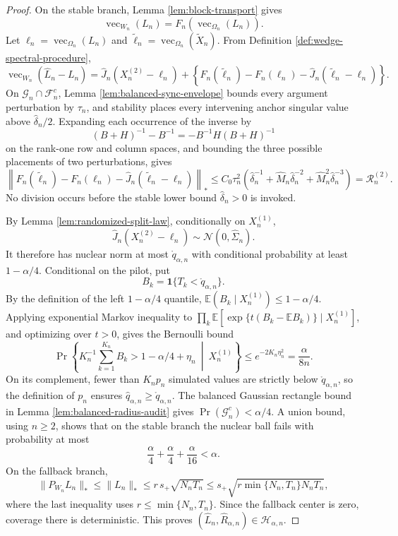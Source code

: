 \documentclass{article}
\begin{document}
\begin{proof}
On the stable branch, Lemma \ref{lem:block-transport} gives
\[
\operatorname{vec}_{W_n}(L_n)
=F_n(\operatorname{vec}_{\Omega_n}(L_n)).
\]
Let \(\ell_n=\operatorname{vec}_{\Omega_n}(L_n)\) and
\(\widetilde\ell_n=\operatorname{vec}_{\Omega_n}(\widetilde X_n)\).  From Definition \ref{def:wedge-spectral-procedure},
\[
\operatorname{vec}_{W_n}(\widehat L_n-L_n)
=\widehat J_n(X_n^{(2)}-\ell_n)
+\left\{F_n(\widetilde\ell_n)-F_n(\ell_n)
-\widehat J_n(\widetilde\ell_n-\ell_n)\right\}.
\]
On \(\mathcal G_n\cap\mathcal F_n^c\), Lemma \ref{lem:balanced-sync-envelope} bounds every argument perturbation by \(\tau_n\), and stability places every intervening anchor singular value above \(\widehat\delta_n/2\).  Expanding each occurrence of the inverse by
\[
(B+H)^{-1}-B^{-1}
=-B^{-1}H(B+H)^{-1}
\]
on the rank-one row and column spaces, and bounding the three possible placements of two perturbations, gives
\[
\left\lVert
F_n(\widetilde\ell_n)-F_n(\ell_n)
-\widehat J_n(\widetilde\ell_n-\ell_n)
\right\rVert_*
\le
C_0\tau_n^2
\left(\widehat\delta_n^{-1}
+\widehat M_n\widehat\delta_n^{-2}
+\widehat M_n^2\widehat\delta_n^{-3}\right)
=\mathscr R_n^{(2)}.
\]
No division occurs before the stable lower bound \(\widehat\delta_n>0\) is invoked.

By Lemma \ref{lem:randomized-split-law}, conditionally on \(X_n^{(1)}\),
\[
\widehat J_n(X_n^{(2)}-\ell_n)
\sim\mathcal N(0,\widehat\Sigma_n).
\]
It therefore has nuclear norm at most \(\mathring q_{\alpha,n}\) with conditional probability at least \(1-\alpha/4\).  Conditional on the pilot, put
\[
B_k=\mathbf1\{T_k<\mathring q_{\alpha,n}\}.
\]
By the definition of the left \(1-\alpha/4\) quantile,
\(\mathbb E(B_k\mid X_n^{(1)})\le1-\alpha/4\).  Applying exponential Markov inequality to
\(\prod_k\mathbb E[\exp\{t(B_k-\mathbb EB_k)\}\mid X_n^{(1)}]\), and optimizing over \(t>0\), gives the Bernoulli bound
\[
\Pr\!\left\{K_n^{-1}\sum_{k=1}^{K_n}B_k>
1-\alpha/4+\eta_n
\ \middle|\ X_n^{(1)}\right\}
\le e^{-2K_n\eta_n^2}
=\frac{\alpha}{8n}.
\]
On its complement, fewer than \(K_np_n\) simulated values are strictly below
\(\mathring q_{\alpha,n}\), so the definition of \(p_n\) ensures
\(\widehat q_{\alpha,n}\ge\mathring q_{\alpha,n}\).  The balanced Gaussian rectangle bound in Lemma \ref{lem:balanced-radius-audit} gives
\(\Pr(\mathcal G_n^c)<\alpha/4\).  A union bound, using \(n\ge2\), shows that on the stable branch the nuclear ball fails with probability at most
\[
\frac{\alpha}{4}+\frac{\alpha}{4}+\frac{\alpha}{16}<\alpha.
\]
On the fallback branch,
\[
\lVert P_{W_n}L_n\rVert_*
\le\lVert L_n\rVert_*
\le r\,s_+\sqrt{N_nT_n}
\le s_+\sqrt{r\min\{N_n,T_n\}N_nT_n},
\]
where the last inequality uses \(r\le\min\{N_n,T_n\}\).  Since the fallback center is zero, coverage there is deterministic.  This proves
\((\widehat L_n,\widehat R_{\alpha,n})\in\mathcal H_{\alpha,n}\).


\end{proof}
\end{document}
